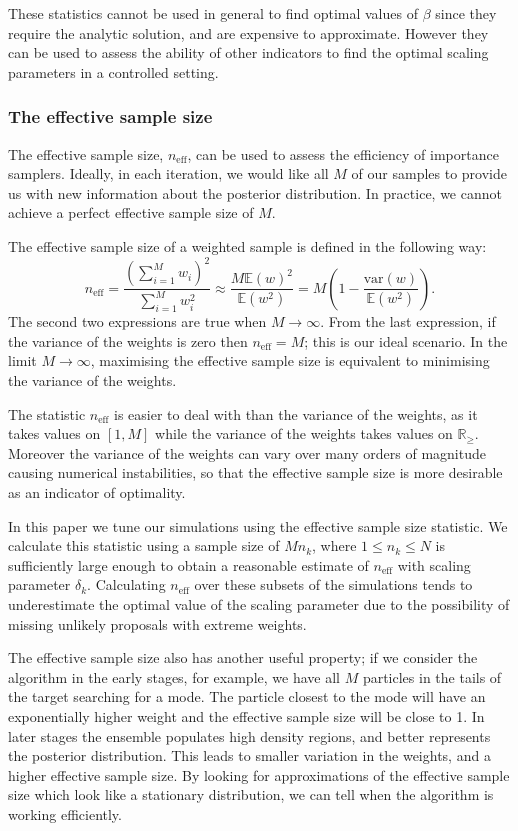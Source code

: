 \documentclass[final]{siamltex}
\newcommand{\neff}{n_{\text{eff}}}
\newcommand{\E}{{\mathbb E}}
\begin{document}
These statistics cannot be used in general to find optimal values of
$\beta$ since they require the analytic solution, and are expensive to
approximate. However they can be used to assess the ability of other
indicators to find the optimal scaling parameters in a controlled
setting.


\subsubsection{The effective sample size}\label{sec:ess}

The effective sample size, $\neff$, can be used to assess the
efficiency of importance samplers. Ideally, in each iteration, we
would like all $M$ of our samples to provide us with new information
about the posterior distribution. In practice, we cannot achieve a
perfect effective sample size of $M$.

The effective sample size of a weighted sample is defined in the
following way:
\[
	\neff = \frac{\left(\sum_{i=1}^M \! w_i\right)^2}{\sum_{i=1}^M \! w_i^2} \approx \frac{M\E(w)^2}{\E(w^2)} = M\left(1 - \frac{\mbox{var}(w)}{\mathbb{E}(w^2)}\right).
\]
The second two expressions are true when $M\rightarrow\infty$. From
the last expression, if the variance of the weights is zero then
$\neff = M$; this is our ideal scenario. In the limit
$M\rightarrow\infty$, maximising the effective
sample size is equivalent to minimising the variance of the weights.

The statistic $\neff$ is easier to deal with than the variance of the
weights, as it takes values on $[1, M]$ while the variance of the
weights takes values on $\mathbb{R}_\geq$. Moreover the variance of
the weights can vary
over many orders of magnitude causing numerical instabilities, so that the effective
sample size is more desirable as an indicator of optimality.

In this paper we tune our simulations using the effective sample size
statistic. We calculate this statistic using a sample size of $Mn_k$,
where $1 \leq n_k\leq N$ is sufficiently large enough to obtain a
reasonable estimate of $\neff$ with scaling parameter $\delta_k$.
Calculating $\neff$ over these subsets of the simulations tends to
underestimate the optimal value of the scaling parameter due to the
possibility of missing unlikely proposals with extreme weights.

The effective sample size also has another useful property; if we
consider the algorithm in the early stages, for example, we have all
$M$ particles in the tails of the target searching for a mode. The
particle closest to the mode will have an exponentially higher weight
and the effective sample size will be close to 1. In later stages the
ensemble populates high density regions, and better represents the
posterior distribution. This leads to smaller variation in the
weights, and a higher effective sample size. By looking for
approximations of the effective sample size which look like a
stationary distribution, we can tell when the algorithm is working
efficiently.
\end{document}
